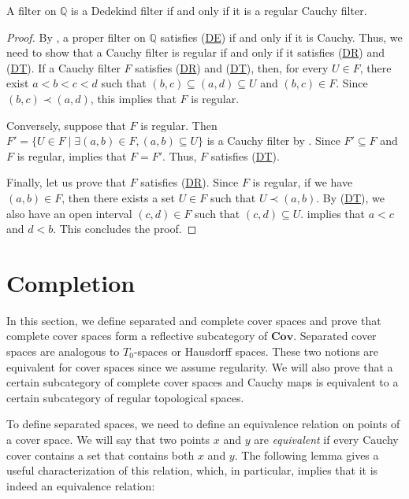 \documentclass[reqno]{amsart}
\newcommand{\axref}[1]{(\hyperref[ax:#1]{#1})}
\theoremstyle{definition}
\theoremstyle{remark}
\numberwithin{figure}{section}
\newcommand{\rb}{\prec}
\newcommand{\cat}[1]{\mathbf{#1}}
\begin{document}
\begin{prop}
A filter on $\mathbb{Q}$ is a Dedekind filter if and only if it is a regular Cauchy filter.
\end{prop}
\begin{proof}
By , a proper filter on $\mathbb{Q}$ satisfies \axref{DE} if and only if it is Cauchy.
Thus, we need to show that a Cauchy filter is regular if and only if it satisfies \axref{DR} and \axref{DT}.
If a Cauchy filter $F$ satisfies \axref{DR} and \axref{DT}, then, for every $U \in F$, there exist $a < b < c < d$ such that $(b,c) \subseteq (a,d) \subseteq U$ and $(b,c) \in F$.
Since $(b,c) \rb (a,d)$, this implies that $F$ is regular.

Conversely, suppose that $F$ is regular.
Then $F' = \{ U \in F \mid \exists (a,b) \in F, (a,b) \subseteq U \}$ is a Cauchy filter by .
Since $F' \subseteq F$ and $F$ is regular,  implies that $F = F'$.
Thus, $F$ satisfies \axref{DT}.

Finally, let us prove that $F$ satisfies \axref{DR}.
Since $F$ is regular, if we have $(a,b) \in F$, then there exists a set $U \in F$ such that $U \rb (a,b)$.
By \axref{DT}, we also have an open interval $(c,d) \in F$ such that $(c,d) \subseteq U$.
 implies that $a < c$ and $d < b$.
This concludes the proof.
\end{proof}

\section{Completion}
\label{sec:completion}

In this section, we define separated and complete cover spaces and prove that complete cover spaces form a reflective subcategory of $\cat{Cov}$.
Separated cover spaces are analogous to $T_0$-spaces or Hausdorff spaces.
These two notions are equivalent for cover spaces since we assume regularity.
We will also prove that a certain subcategory of complete cover spaces and Cauchy maps is equivalent to a certain subcategory of regular topological spaces.

To define separated spaces, we need to define an equivalence relation on points of a cover space.
We will say that two points $x$ and $y$ are \emph{equivalent} if every Cauchy cover contains a set that contains both $x$ and $y$.
The following lemma gives a useful characterization of this relation, which, in particular, implies that it is indeed an equivalence relation:
\end{document}
